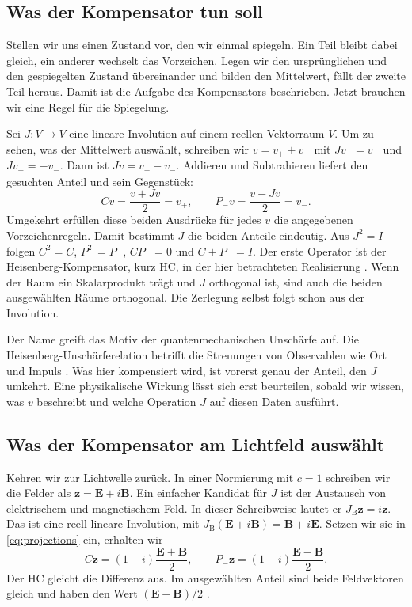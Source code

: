 \subsection{Was der Kompensator tun soll}
\label{sec:carrier}

Stellen wir uns einen Zustand vor, den wir einmal spiegeln. Ein Teil bleibt dabei gleich, ein anderer wechselt das Vorzeichen. Legen wir den ursprünglichen und den gespiegelten Zustand übereinander und bilden den Mittelwert, fällt der zweite Teil heraus. Damit ist die Aufgabe des Kompensators beschrieben. Jetzt brauchen wir eine Regel für die Spiegelung.

Sei \(J:V\to V\) eine lineare Involution auf einem reellen Vektorraum \(V\). Um zu sehen, was der Mittelwert auswählt, schreiben wir \(v=v_++v_-\) mit \(Jv_+=v_+\) und \(Jv_-=-v_-\). Dann ist \(Jv=v_+-v_-\). Addieren und Subtrahieren liefert den gesuchten Anteil und sein Gegenstück:
\begin{equation}
 Cv=\frac{v+Jv}{2}=v_+,\qquad
 P_-v=\frac{v-Jv}{2}=v_-.
 \label{eq:projections}
\end{equation}
Umgekehrt erfüllen diese beiden Ausdrücke für jedes \(v\) die angegebenen Vorzeichenregeln. Damit bestimmt \(J\) die beiden Anteile eindeutig. Aus \(J^2=I\) folgen \(C^2=C\), \(P_-^2=P_-\), \(CP_-=0\) und \(C+P_-=I\). Der erste Operator ist der Heisenberg-Kompensator, kurz HC, in der hier betrachteten Realisierung \cite{physics}. Wenn der Raum ein Skalarprodukt trägt und \(J\) orthogonal ist, sind auch die beiden ausgewählten Räume orthogonal. Die Zerlegung selbst folgt schon aus der Involution.

Der Name greift das Motiv der quantenmechanischen Unschärfe auf. Die Heisenberg-Unschärferelation betrifft die Streuungen von Observablen wie Ort und Impuls \cite{robertson}. Was hier kompensiert wird, ist vorerst genau der Anteil, den \(J\) umkehrt. Eine physikalische Wirkung lässt sich erst beurteilen, sobald wir wissen, was \(v\) beschreibt und welche Operation \(J\) auf diesen Daten ausführt.

\subsection{Was der Kompensator am Lichtfeld auswählt}
\label{sec:field-compensation}

Kehren wir zur Lichtwelle zurück. In einer Normierung mit \(c=1\) schreiben wir die Felder als \(\mathbf z=\mathbf E+i\mathbf B\). Ein einfacher Kandidat für \(J\) ist der Austausch von elektrischem und magnetischem Feld. In dieser Schreibweise lautet er \(J_{\mathrm B}\mathbf z=i\overline{\mathbf z}\). Das ist eine reell-lineare Involution, mit \(J_{\mathrm B}(\mathbf E+i\mathbf B)=\mathbf B+i\mathbf E\). Setzen wir sie in \eqref{eq:projections} ein, erhalten wir
\begin{equation}
 C\mathbf z=(1+i)\frac{\mathbf E+\mathbf B}{2},
 \qquad
 P_-\mathbf z=(1-i)\frac{\mathbf E-\mathbf B}{2}.
 \label{eq:hc-field}
\end{equation}
Der HC gleicht die Differenz aus. Im ausgewählten Anteil sind beide Feldvektoren gleich und haben den Wert \((\mathbf E+\mathbf B)/2\) \cite{grundidee,feldsektoren}.

